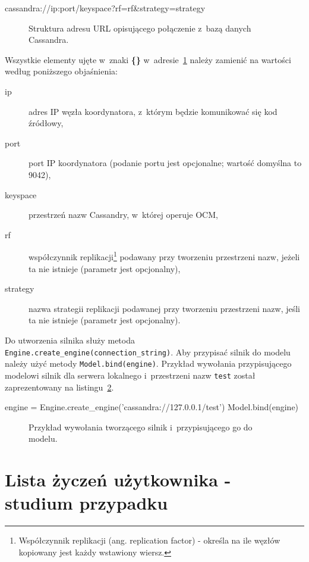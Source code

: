 \begin{verbbox}
	cassandra://{ip}:{port}/{keyspace}?rf={rf}&strategy={strategy}
\end{verbbox}

\begin{figure}[ht!]
	\centering
	\theverbbox
	\caption{Struktura adresu URL opisującego połączenie z~bazą danych Cassandra.}
	\label{lst:connection_string}
\end{figure}

Wszystkie elementy ujęte w~znaki \textbf{\{\}} w~adresie~\ref{lst:connection_string} należy zamienić na wartości według poniższego objaśnienia:

\begin{description}
	\item[ip] adres IP węzła koordynatora, z~którym będzie komunikować się kod źródłowy,
	\item[port] port IP koordynatora (podanie portu jest opcjonalne; wartość domyślna to 9042),
	\item[keyspace] przestrzeń nazw Cassandry, w~której operuje OCM,
	\item[rf] współczynnik replikacji\footnote{Współczynnik replikacji (ang. replication factor) - określa na ile węzłów kopiowany jest każdy wstawiony wiersz.} podawany przy tworzeniu przestrzeni nazw, jeżeli ta nie istnieje (parametr jest opcjonalny),
	\item[strategy] nazwa strategii replikacji podawanej przy tworzeniu przestrzeni nazw, jeśli ta nie istnieje (parametr jest opcjonalny).
\end{description}

Do utworzenia silnika służy metoda \verb+Engine.create_engine(connection_string)+. Aby przypisać silnik do modelu należy użyć metody \verb+Model.bind(engine)+. Przykład wywołania przypisującego modelowi silnik dla serwera lokalnego i~przestrzeni nazw \verb+test+ został zaprezentowany na listingu~\ref{lst:engine_creation}.

\begin{verbbox}
	engine = Engine.create_engine('cassandra://127.0.0.1/test')
	Model.bind(engine)
\end{verbbox}

\begin{figure}[ht!]
	\centering
	\theverbbox
	\caption{Przykład wywołania tworzącego silnik i~przypisującego go do modelu.}
	\label{lst:engine_creation}
\end{figure} 

\section{Lista życzeń użytkownika - studium przypadku}

